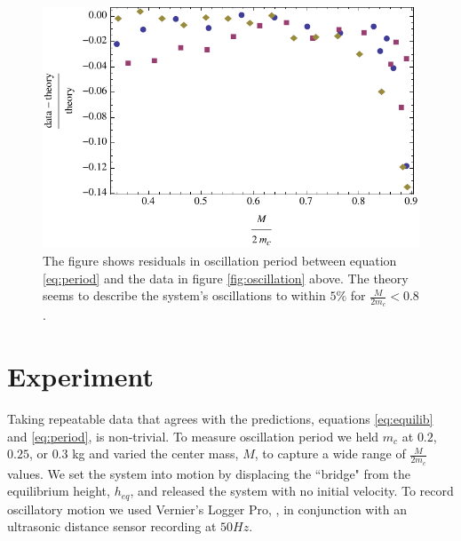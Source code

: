 \documentclass[12pt]{iopart}
\begin{document}
\begin{figure}[h!]
\centering
\includegraphics[width=\textwidth]{osc_residuals_T_d40.pdf}
\caption{
The figure shows residuals in oscillation period between equation \ref{eq:period} and the data in figure \ref{fig:oscillation} above.  The theory seems to describe the system's oscillations to within $5\%$ for $\frac{M}{2m_c}<0.8$.
}
\label{fig:oscillation_residuals}
\end{figure}

\section{Experiment}

Taking repeatable data that agrees with the predictions, equations \ref{eq:equilib} and \ref{eq:period}, is non-trivial.  To measure oscillation period we held $m_c$ at $0.2$, $0.25$, or $0.3$ kg and varied the center mass, $M$, to capture a wide range of $\frac{M}{2m_c}$ values. 
We set the system into motion by displacing the ``bridge" from the equilibrium height, $h_{eq}$, and released the system with no initial velocity.  To record oscillatory motion we used Vernier's Logger Pro, \cite{Logger_pro_reference}, in conjunction with an ultrasonic distance sensor recording at $50Hz$.
\end{document}
